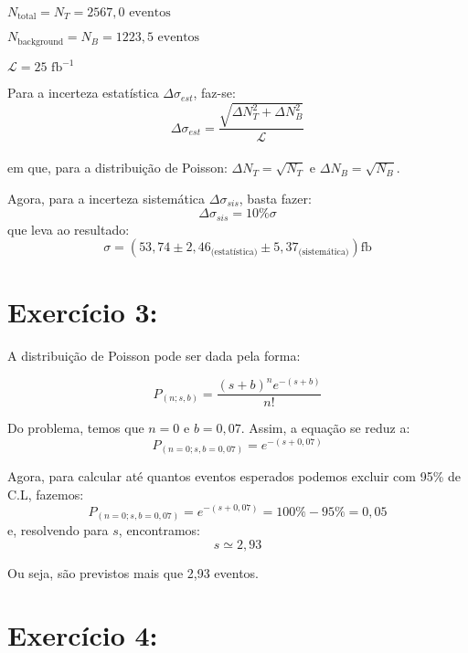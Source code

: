 \documentclass[14pt]{extarticle}
\begin{document}
$N_{\text{total}} =N_{T}= 2567,0 \text{ eventos}$

$N_{\text{background}} =N_{B}= 1223,5 \text{ eventos}$

$\mathcal{L} = 25 \text{ fb}^{-1}$

\hspace*{0.5cm}

Para a incerteza estatística $\Delta\sigma_{est}$, faz-se:\large $$\Delta\sigma_{est}=\frac{\sqrt{\Delta N^{2}_{T}+\Delta N^{2}_{B}}}{\mathcal{L}}$$\\
\normalsize em que, para a distribuição de Poisson: $\Delta N_{T} = \sqrt{N_{T}}$ e $\Delta N_{B} = \sqrt{N_{B}}$.

\vspace{1em}

Agora, para a incerteza sistemática $\Delta\sigma_{sis}$, basta fazer:\large$$\Delta\sigma_{sis}=10\%\sigma$$
\normalsize que leva ao resultado:
\large $$\sigma=\left(53,74\pm2,46_{\text{(estatística)}}\pm5,37_{\text{(sistemática)}}\right)\text{fb}$$
\normalsize

\newpage

\section*{\hspace{-1cm}Exercício 3:}

\hspace*{0.5cm}

A distribuição de Poisson pode ser dada pela forma:

\large$$P_{(n;s,b)}=\frac{(s+b)^{n}e^{-(s+b)}}{n!}$$\normalsize

\vspace{1em}

Do problema, temos que $n=0$ e $b=0,07$. Assim, a equação se reduz a: \large$$P_{(n=0;s,b=0,07)}=e^{-(s+0,07)}$$\normalsize

\vspace{1em}

Agora, para calcular até quantos eventos esperados podemos excluir com 95\% de C.L, fazemos: \large$$P_{(n=0;s,b=0,07)}=e^{-(s+0,07)}=100\%-95\%=0,05$$\normalsize e, resolvendo para $s$, encontramos: \large $$s\simeq2,93$$\normalsize

Ou seja, são previstos mais que 2,93 eventos.

\newpage

\section*{\hspace{-1cm}Exercício 4:}
\end{document}
